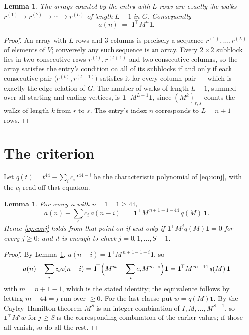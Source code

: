 \documentclass[11pt,a4paper]{article}
\theoremstyle{plain}
\newtheorem{lemma}[theorem]{Lemma}
\theoremstyle{definition}
\begin{document}
\begin{lemma}\label{lem:walk}
The arrays counted by the entry with $L$ rows are exactly the walks
$r^{(1)}\to r^{(2)}\to\cdots\to r^{(L)}$ of length $L-1$ in $G$. Consequently
\[
a(n)\;=\;\mathbf{1}^{\!\top}M^{n}\mathbf{1} .
\]
\end{lemma}

\begin{proof}
An array with $L$ rows and $3$ columns is precisely a sequence
$r^{(1)},\dots,r^{(L)}$ of elements of $V$; conversely any such sequence is an array.
Every $2\times2$ subblock lies in two consecutive rows $r^{(t)},r^{(t+1)}$ and two
consecutive columns, so the array satisfies the entry's condition on all of its subblocks
if and only if each consecutive pair $\bigl(r^{(t)},r^{(t+1)}\bigr)$ satisfies it for
every column pair --- which is exactly the edge relation of $G$. The number of walks of
length $L-1$, summed over all starting and ending vertices, is
$\mathbf{1}^{\!\top}M^{L-1}\mathbf{1}$, since $(M^{k})_{r,s}$ counts the walks of
length $k$ from $r$ to $s$. The entry's index $n$ corresponds to $L=n+1$ rows.
\end{proof}

\section{The criterion}

Let $q(t)=t^{44}-\sum_i c_i\,t^{44-i}$ be the characteristic polynomial of
\eqref{eq:conj}, with the $c_i$ read off that equation.

\begin{lemma}\label{lem:crit}
For every $n$ with $n+1-1\ge44$,
\[
a(n)-\sum_i c_i\,a(n-i)\;=\;\mathbf{1}^{\!\top}M^{\,n+1-1-44}\,q(M)\,\mathbf{1} .
\]
Hence \eqref{eq:conj} holds from that point on if and only if
$\mathbf{1}^{\!\top}M^{j}q(M)\mathbf{1}=0$ for every $j\ge0$; and it is enough to check
$j=0,1,\dots,S-1$.
\end{lemma}

\begin{proof}
By Lemma~\ref{lem:walk}, $a(n-i)=\mathbf{1}^{\!\top}M^{\,n+1-1-i}\mathbf{1}$, so
\[
a(n)-\sum_i c_i a(n-i)
=\mathbf{1}^{\!\top}\Bigl(M^{m}-\sum_i c_i M^{m-i}\Bigr)\mathbf{1}
=\mathbf{1}^{\!\top}M^{\,m-44}\,q(M)\,\mathbf{1}
\]
with $m=n+1-1$, which is the stated identity; the equivalence follows by letting
$m-44=j$ run over $\ge0$. For the last clause put $w=q(M)\mathbf{1}$. By the
Cayley--Hamilton theorem $M^{S}$ is an integer combination of $I,M,\dots,M^{S-1}$, so
$\mathbf{1}^{\!\top}M^{j}w$ for $j\ge S$ is the corresponding combination of the earlier
values; if those all vanish, so do all the rest.
\end{proof}
\end{document}
